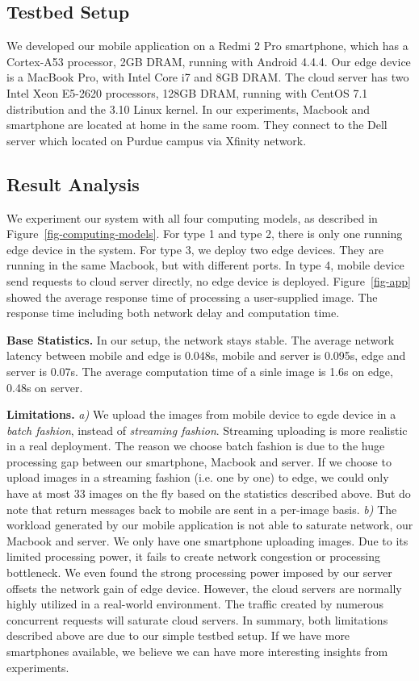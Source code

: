 \subsection{Testbed Setup}
We developed our mobile application on a Redmi 2 Pro smartphone, which has a Cortex-A53 processor, 2GB DRAM,
running with Android 4.4.4.
Our edge device is a MacBook Pro, with Intel Core i7 and 8GB DRAM. The cloud server has two Intel Xeon
E5-2620 processors, 128GB DRAM, running with CentOS 7.1 distribution and the 3.10 Linux kernel.
In our experiments, Macbook and smartphone are located at home in the same room. They connect to
the Dell server which located on Purdue campus via Xfinity network. 

\subsection{Result Analysis}
We experiment our system with all four computing models, as described in Figure~\ref{fig-computing-models}.
For type 1 and type 2, there is only one running edge device in the system. For type 3, we deploy two
edge devices. They are running in the same Macbook, but with different ports. In type 4, mobile device
send requests to cloud server directly, no edge device is deployed. Figure~\ref{fig-app} showed the
average response time of processing a user-supplied image. The response time including both network
delay and computation time.

\hfill\break
\noindent \textbf{Base Statistics.}
In our setup, the network stays stable. The average network latency between mobile
and edge is 0.048s, mobile and server is 0.095s, edge and server is 0.07s.
The average computation time of a sinle image is 1.6s on edge, 0.48s on server.

\hfill\break
\noindent \textbf{Limitations.}
{\it a)} We upload the images from mobile device to egde device in a {\em batch fashion}, instead of
{\em streaming fashion}. Streaming uploading is more realistic in a real deployment.
The reason we choose batch fashion is due to
the huge processing gap between our smartphone, Macbook and server. If we choose to upload
images in a streaming fashion (i.e. one by one) to edge, we could only have at most
33 images on the fly based on the statistics described above. But do note that return messages
back to mobile are sent in a per-image basis.
{\it b)} The workload generated by our mobile application is not able to saturate network, our Macbook and server.
We only have one smartphone uploading images. Due to its limited processing power, it fails to create
network congestion or processing bottleneck. We even found the strong processing power imposed by our
server offsets the network gain of edge device. However, the cloud servers are normally highly utilized
in a real-world environment. The traffic created by numerous concurrent requests will saturate cloud
servers. In summary, both limitations described above are due to our simple testbed setup. If we have
more smartphones available, we believe we can have more interesting insights from experiments.

